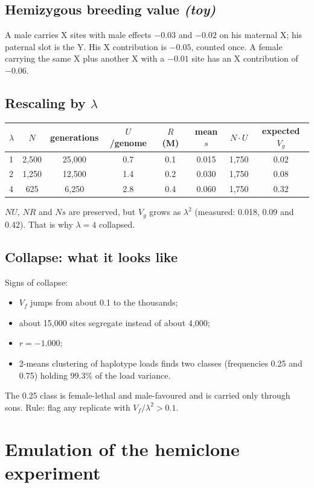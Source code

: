 \subsection{Hemizygous breeding value \emph{(toy)}}
A male carries X sites with male effects $-0.03$ and $-0.02$ on his maternal X; his paternal slot is the Y. His X contribution is $-0.05$, counted once. A female carrying the same X plus another X with a $-0.01$ site has an X contribution of $-0.06$.

\subsection{Rescaling by $\lambda$}
\begin{center}\begin{tabular}{lccccccc}\toprule
$\lambda$ & $N$ & generations & $U$/genome & $R$ (M) & mean $s$ & $N\!\cdot\!U$ & expected $V_g$\\\midrule
1 & 2,500 & 25,000 & 0.7 & 0.1 & 0.015 & 1,750 & 0.02\\
2 & 1,250 & 12,500 & 1.4 & 0.2 & 0.030 & 1,750 & 0.08\\
4 & 625 & 6,250 & 2.8 & 0.4 & 0.060 & 1,750 & 0.32\\\bottomrule
\end{tabular}\end{center}
$NU$, $NR$ and $Ns$ are preserved, but $V_g$ grows as $\lambda^2$ (measured: 0.018, 0.09 and 0.42). That is why $\lambda=4$ collapsed.

\subsection{Collapse: what it looks like}
Signs of collapse:
\begin{itemize}
\item $V_f$ jumps from about 0.1 to the thousands;
\item about 15,000 sites segregate instead of about 4,000;
\item $r=-1.000$;
\item 2-means clustering of haplotype loads finds two classes (frequencies 0.25 and 0.75) holding 99.3\% of the load variance.
\end{itemize}
The 0.25 class is female-lethal and male-favoured and is carried only through sons. Rule: flag any replicate with $V_f/\lambda^2>0.1$.

\section{Emulation of the hemiclone experiment}
